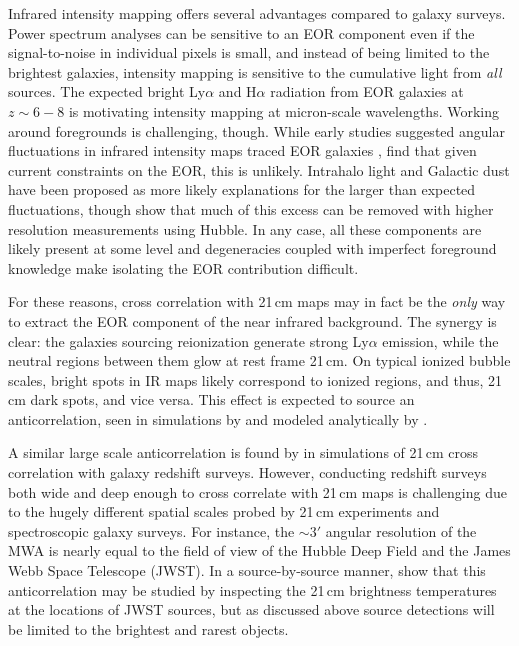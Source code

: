 \documentclass[numberedappendix]{emulateapj}
\begin{document}
Infrared intensity mapping offers several advantages compared to galaxy surveys. Power spectrum analyses can be sensitive to an EOR component even if the signal-to-noise in individual pixels is small, and instead of being limited to the brightest galaxies, intensity mapping is sensitive to the cumulative light from \textit{all} sources. The expected bright Ly$\alpha$ \citep[e.g.][]{primevaltwins} and H$\alpha$ \citep[e.g.][]{brightemissionlines} radiation from EOR galaxies at $z\sim6-8$ is motivating intensity mapping at micron-scale wavelengths. Working around foregrounds is challenging, though. While early studies suggested angular fluctuations in infrared intensity maps traced EOR galaxies \citep[e.g.,][]{kash1,kash2,kash3}, \citet{kash4} find that given current constraints on the EOR, this is unlikely. Intrahalo light \citet{cooray12,zemcov14} and Galactic dust \citet{yue16} have been proposed as more likely explanations for the larger than expected fluctuations, though \citet{mw15} show that much of this excess can be removed with higher resolution measurements using Hubble. In any case, all these components are likely present at some level and degeneracies coupled with imperfect foreground knowledge make isolating the EOR contribution difficult.

For these reasons, cross correlation with 21\,cm maps may in fact be the \textit{only} way to extract the EOR component of the near infrared background. The synergy is clear: the galaxies sourcing reionization generate strong Ly$\alpha$ emission, while the neutral regions between them glow at rest frame 21\,cm. On typical ionized bubble scales, bright spots in IR maps likely correspond to ionized regions, and thus, 21\,cm dark spots, and vice versa. This effect is expected to source an anticorrelation, seen in simulations by \citet{silva12,Heneka2016} and modeled analytically by \citet{feng17,mao14}.

A similar large scale anticorrelation is found by \citet{lidz09,park14} in simulations of 21\,cm cross correlation with galaxy redshift surveys. However, conducting redshift surveys both wide and deep enough to cross correlate with 21\,cm maps is challenging due to the hugely different spatial scales probed by 21\,cm experiments and spectroscopic galaxy surveys. For instance, the $\sim3'$ angular resolution of the MWA is nearly equal to the field of view of the Hubble Deep Field and the James Webb Space Telescope (JWST). In a source-by-source manner, \citep{beardsley15} show that this anticorrelation may be studied by inspecting the 21\,cm brightness temperatures at the locations of JWST sources, but as discussed above source detections will be limited to the brightest and rarest objects.
\end{document}
